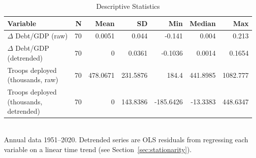 \begin{table}[htbp]
  \centering
  \caption{Descriptive Statistics}
  \label{tab:descriptive}
  \begin{tabular}{lrrrrrr}
    \toprule
    Variable & N & Mean & SD & Min & Median & Max \\
    \midrule
    $\Delta$ Debt/GDP (raw) & 70 & 0.0051 & 0.044 & -0.141 & 0.004 & 0.213 \\
    $\Delta$ Debt/GDP (detrended) & 70 & 0 & 0.0361 & -0.1036 & 0.0014 & 0.1654 \\
    Troops deployed (thousands, raw) & 70 & 478.0671 & 231.5876 & 184.4 & 441.8985 & 1082.777 \\
    Troops deployed (thousands, detrended) & 70 & 0 & 143.8386 & -185.6426 & -13.3383 & 448.6347 \\
    \bottomrule
  \end{tabular}
  \\[2pt] \footnotesize{Annual data 1951--2020. Detrended series are OLS residuals from regressing each variable on a linear time trend (see Section~\ref{sec:stationarity}).}
\end{table}

